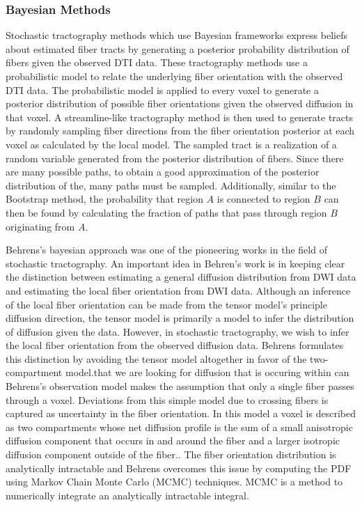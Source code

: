 \subsubsection{Bayesian Methods}
Stochastic tractography methods which use Bayesian frameworks express beliefs about estimated fiber tracts by generating a posterior probability distribution of fibers given the observed DTI data.   These tractography methods use a probabilistic model to relate the underlying fiber orientation with the observed DTI data.  The probabilistic model is applied to every voxel to generate a posterior distribution of possible fiber orientations given the observed diffusion in that voxel.  A streamline-like tractography method is then used to generate tracts by randomly sampling fiber directions from the fiber orientation posterior at each voxel as calculated by the local model.  The sampled tract is a realization of a random variable generated from the posterior distribution of fibers.  Since there are many possible paths, to obtain a good approximation of the posterior distribution of the, many paths must be sampled.  Additionally, similar to the Bootstrap method, the probability that region $A$ is connected to region $B$ can then be found by calculating the fraction of paths that pass through region $B$ originating from $A$.

Behrens's bayesian approach was one of the pioneering works in the field of stochastic tractography\cite{behrensMRM03}. An important idea in Behren's work is in keeping clear the distinction between estimating a general diffusion distribution from DWI data and estimating the local fiber orientation from DWI data.  Although an inference of the local fiber orientation can be made from the tensor model's principle diffusion direction, the tensor model is primarily a model to infer the distribution of diffusion given the data.  However, in stochastic tractography, we wish to infer the local fiber orientation from the observed diffusion data.  Behrens formulates this distinction by avoiding the tensor model altogether in favor of the two-compartment model.that we are looking for diffusion that is occuring within  can Behrens's observation model makes the assumption that only a single fiber passes through a voxel.  Deviations from this simple model due to crossing fibers is captured as uncertainty in the fiber orientation.  In this model a voxel is described as two compartments whose net diffusion profile is the sum of a small anisotropic diffusion component that occurs in and around the fiber and a larger isotropic diffusion component outside of the fiber.\cite{behrensMRM03}.  The fiber orientation distribution is analytically intractable and Behrens overcomes this issue by computing the PDF using Markov Chain Monte Carlo (MCMC) techniques.  MCMC is a method to numerically integrate an analytically intractable integral.  
